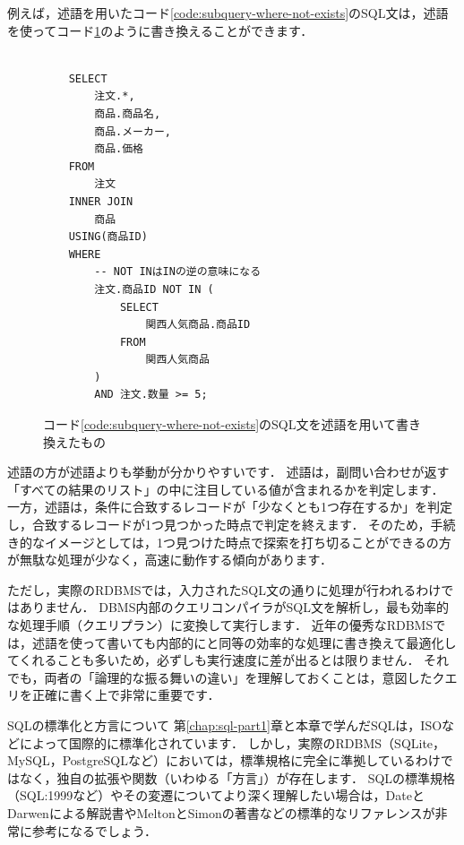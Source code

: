 例えば，述語を用いたコード\ref{code:subquery-where-not-exists}のSQL文は，述語を使ってコード\ref{code:subquery-where-not-in}のように書き換えることができます．
\begin{figure}[!htbp]
    \begin{verbatim}

    SELECT
        注文.*,
        商品.商品名,
        商品.メーカー,
        商品.価格
    FROM
        注文
    INNER JOIN
        商品
    USING(商品ID)
    WHERE
        -- NOT INはINの逆の意味になる
        注文.商品ID NOT IN (
            SELECT
                関西人気商品.商品ID
            FROM
                関西人気商品
        )
        AND 注文.数量 >= 5;

    \end{verbatim}
    \captionsetup{name=コード}
    \caption{コード\ref{code:subquery-where-not-exists}のSQL文を述語を用いて書き換えたもの}
    \label{code:subquery-where-not-in}
\end{figure}

述語の方が述語よりも挙動が分かりやすいです．
述語は，副問い合わせが返す「すべての結果のリスト」の中に注目している値が含まれるかを判定します．
一方，述語は，条件に合致するレコードが「少なくとも1つ存在するか」を判定し，合致するレコードが1つ見つかった時点で判定を終えます．
そのため，手続き的なイメージとしては，1つ見つけた時点で探索を打ち切ることができるの方が無駄な処理が少なく，高速に動作する傾向があります．

ただし，実際のRDBMSでは，入力されたSQL文の通りに処理が行われるわけではありません．
DBMS内部のクエリコンパイラがSQL文を解析し，最も効率的な処理手順（クエリプラン）に変換して実行します．
近年の優秀なRDBMSでは，述語を使って書いても内部的にと同等の効率的な処理に書き換えて最適化してくれることも多いため，必ずしも実行速度に差が出るとは限りません．
それでも，両者の「論理的な振る舞いの違い」を理解しておくことは，意図したクエリを正確に書く上で非常に重要です．


\begin{tipbox}{SQLの標準化と方言について}
第\ref{chap:sql-part1}章と本章で学んだSQLは，ISOなどによって国際的に標準化されています．
しかし，実際のRDBMS（SQLite，MySQL，PostgreSQLなど）においては，標準規格に完全に準拠しているわけではなく，独自の拡張や関数（いわゆる「方言」）が存在します．
SQLの標準規格（SQL:1999など）やその変遷についてより深く理解したい場合は，DateとDarwenによる解説書\cite{Date1997}やMeltonとSimonの著書\cite{Melton1993}などの標準的なリファレンスが非常に参考になるでしょう．
\end{tipbox}


